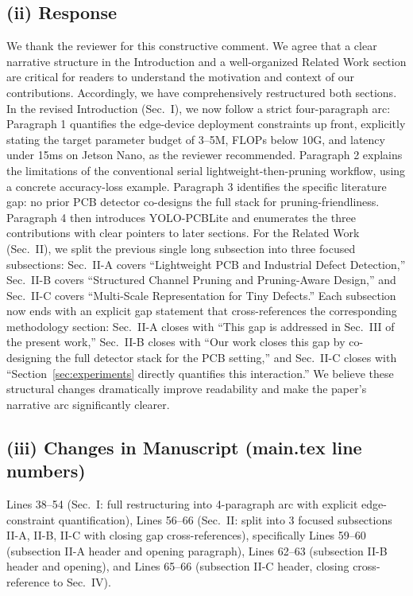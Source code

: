 \documentclass[conference]{IEEEtran}
\begin{document}
\subsection*{(ii) Response}
We thank the reviewer for this constructive comment. We agree that a clear narrative structure in the Introduction and a well-organized Related Work section are critical for readers to understand the motivation and context of our contributions. Accordingly, we have comprehensively restructured both sections. In the revised Introduction (Sec.~I), we now follow a strict four-paragraph arc: Paragraph 1 quantifies the edge-device deployment constraints up front, explicitly stating the target parameter budget of 3--5M, FLOPs below 10G, and latency under 15ms on Jetson Nano, as the reviewer recommended. Paragraph 2 explains the limitations of the conventional serial lightweight-then-pruning workflow, using a concrete accuracy-loss example. Paragraph 3 identifies the specific literature gap: no prior PCB detector co-designs the full stack for pruning-friendliness. Paragraph 4 then introduces YOLO-PCBLite and enumerates the three contributions with clear pointers to later sections. For the Related Work (Sec.~II), we split the previous single long subsection into three focused subsections: Sec.~II-A covers ``Lightweight PCB and Industrial Defect Detection,'' Sec.~II-B covers ``Structured Channel Pruning and Pruning-Aware Design,'' and Sec.~II-C covers ``Multi-Scale Representation for Tiny Defects.'' Each subsection now ends with an explicit gap statement that cross-references the corresponding methodology section: Sec.~II-A closes with ``This gap is addressed in Sec.~III of the present work,'' Sec.~II-B closes with ``Our work closes this gap by co-designing the full detector stack for the PCB setting,'' and Sec.~II-C closes with ``Section~\ref{sec:experiments} directly quantifies this interaction.'' We believe these structural changes dramatically improve readability and make the paper's narrative arc significantly clearer.

\subsection*{(iii) Changes in Manuscript (main.tex line numbers)}
Lines 38--54 (Sec.~I: full restructuring into 4-paragraph arc with explicit edge-constraint quantification), Lines 56--66 (Sec.~II: split into 3 focused subsections II-A, II-B, II-C with closing gap cross-references), specifically Lines 59--60 (subsection II-A header and opening paragraph), Lines 62--63 (subsection II-B header and opening), and Lines 65--66 (subsection II-C header, closing cross-reference to Sec.~IV).
\end{document}
